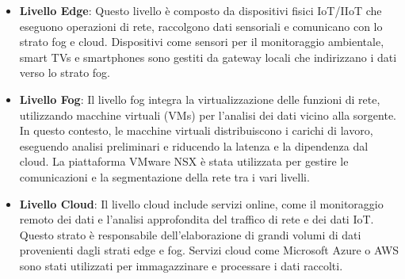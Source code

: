 \begin{itemize}
    \item \textbf{Livello Edge}: Questo livello è composto da dispositivi fisici IoT/IIoT che eseguono operazioni di rete, raccolgono dati sensoriali e comunicano con lo strato fog e cloud. Dispositivi come sensori per il monitoraggio ambientale, smart TVs e smartphones sono gestiti da gateway locali che indirizzano i dati verso lo strato fog.
    
    \item \textbf{Livello Fog}: Il livello fog integra la virtualizzazione delle funzioni di rete, utilizzando macchine virtuali (VMs) per l'analisi dei dati vicino alla sorgente. In questo contesto, le macchine virtuali distribuiscono i carichi di lavoro, eseguendo analisi preliminari e riducendo la latenza e la dipendenza dal cloud. La piattaforma VMware NSX è stata utilizzata per gestire le comunicazioni e la segmentazione della rete tra i vari livelli.
    
    \item \textbf{Livello Cloud}: Il livello cloud include servizi online, come il monitoraggio remoto dei dati e l'analisi approfondita del traffico di rete e dei dati IoT. Questo strato è responsabile dell'elaborazione di grandi volumi di dati provenienti dagli strati edge e fog. Servizi cloud come Microsoft Azure o AWS sono stati utilizzati per immagazzinare e processare i dati raccolti.
\end{itemize}

